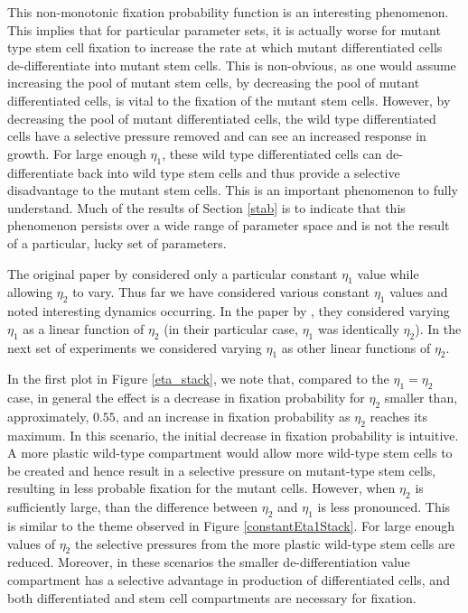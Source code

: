 \documentclass[12pt]{article}
\begin{document}
This non-monotonic fixation probability function is an interesting phenomenon. This implies that for particular parameter sets, it is actually worse for mutant type stem cell fixation to increase the rate at which mutant differentiated cells de-differentiate into mutant stem cells. This is non-obvious, as one would assume increasing the pool of mutant stem cells, by decreasing the pool of mutant differentiated cells, is vital to the fixation of the mutant stem cells. However, by decreasing the pool of mutant differentiated cells, the wild type differentiated cells have a selective pressure removed and can see an increased response in growth. For large enough $\eta_1$, these wild type differentiated cells can de-differentiate back into wild type stem cells and thus provide a selective disadvantage to the mutant stem cells. This is an important phenomenon to fully understand. Much of the results of Section \ref{stab} is to indicate that this phenomenon persists over a wide range of parameter space and is not the result of a particular, lucky set of parameters.

The original paper by \cite{mohammad} considered only a particular constant $\eta_1$ value while allowing $\eta_2$ to vary. Thus far we have considered various constant $\eta_1$ values and noted interesting dynamics occurring. In the paper by \cite{wodarz}, they considered varying $\eta_1$ as a linear function of $\eta_2$ (in their particular case, $\eta_1$ was identically $\eta_2$). In the next set of experiments we considered varying $\eta_1$ as other linear functions of $\eta_2$. 

In the first plot in Figure \ref{eta_stack}, we note that, compared to the $\eta_1=\eta_2$ case, in general the effect is a decrease in fixation probability for $\eta_2$ smaller than, approximately, $0.55$, and an increase in fixation probability as $\eta_2$ reaches its maximum. In this scenario, the initial decrease in fixation probability is intuitive. A more plastic wild-type compartment would allow more wild-type stem cells to be created and hence result in a selective pressure on mutant-type stem cells, resulting in less probable fixation for the mutant cells. However, when $\eta_2$ is sufficiently large, than the difference between $\eta_2$ and $\eta_1$ is less pronounced. This is similar to the theme observed in Figure \ref{constantEta1Stack}. For large enough values of $\eta_2$ the selective pressures from the more plastic wild-type stem cells are reduced. Moreover, in these scenarios the smaller de-differentiation value compartment has a selective advantage in production of differentiated cells, and both differentiated and stem cell compartments are necessary for fixation.
\end{document}

